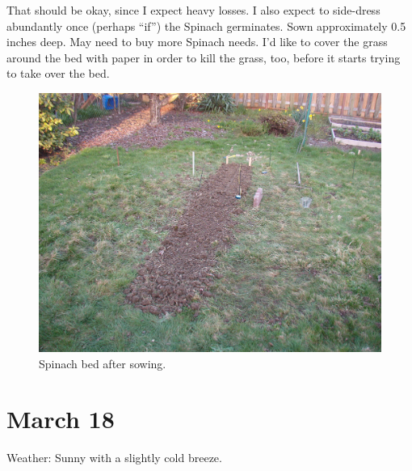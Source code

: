 \documentclass{article}
\begin{document}
That should be okay, since I expect heavy losses. I also expect to side-dress abundantly once (perhaps ``if'') the Spinach germinates. Sown approximately 0.5 inches deep. May need to buy more Spinach needs. I'd like to cover the grass around the bed with paper in order to kill the grass, too, before it starts trying to take over the bed. \\
\begin{figure}
\protect \includegraphics[scale=0.20]{pics/0317_bed.jpg}
\caption{Spinach bed after sowing.}
\end{figure}

\section*{March 18}
Weather: Sunny with a slightly cold breeze.
\end{document}

